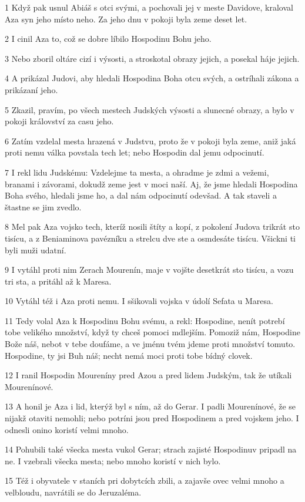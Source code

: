 \par 1 Když pak usnul Abiáš s otci svými, a pochovali jej v meste Davidove, kraloval Aza syn jeho místo neho. Za jeho dnu v pokoji byla zeme deset let.
\par 2 I cinil Aza to, což se dobre líbilo Hospodinu Bohu jeho.
\par 3 Nebo zboril oltáre cizí i výsosti, a stroskotal obrazy jejich, a posekal háje jejich.
\par 4 A prikázal Judovi, aby hledali Hospodina Boha otcu svých, a ostríhali zákona a prikázaní jeho.
\par 5 Zkazil, pravím, po všech mestech Judských výsosti a slunecné obrazy, a bylo v pokoji království za casu jeho.
\par 6 Zatím vzdelal mesta hrazená v Judstvu, proto že v pokoji byla zeme, aniž jaká proti nemu válka povstala tech let; nebo Hospodin dal jemu odpocinutí.
\par 7 I rekl lidu Judskému: Vzdelejme ta mesta, a ohradme je zdmi a vežemi, branami i závorami, dokudž zeme jest v moci naší. Aj, že jsme hledali Hospodina Boha svého, hledali jsme ho, a dal nám odpocinutí odevšad. A tak staveli a štastne se jim zvedlo.
\par 8 Mel pak Aza vojsko tech, kteríž nosili štíty a kopí, z pokolení Judova trikrát sto tisícu, a z Beniaminova pavézníku a strelcu dve ste a osmdesáte tisícu. Všickni ti byli muži udatní.
\par 9 I vytáhl proti nim Zerach Mourenín, maje v vojšte desetkrát sto tisícu, a vozu tri sta, a pritáhl až k Maresa.
\par 10 Vytáhl též i Aza proti nemu. I sšikovali vojska v údolí Sefata u Maresa.
\par 11 Tedy volal Aza k Hospodinu Bohu svému, a rekl: Hospodine, nenít potrebí tobe velikého množství, když ty chceš pomoci mdlejším. Pomoziž nám, Hospodine Bože náš, nebot v tebe doufáme, a ve jménu tvém jdeme proti množství tomuto. Hospodine, ty jsi Buh náš; necht nemá moci proti tobe bídný clovek.
\par 12 I ranil Hospodin Moureníny pred Azou a pred lidem Judským, tak že utíkali Mourenínové.
\par 13 A honil je Aza i lid, kterýž byl s ním, až do Gerar. I padli Mourenínové, že se nijakž otaviti nemohli; nebo potríni jsou pred Hospodinem a pred vojskem jeho. I odnesli onino koristí velmi mnoho.
\par 14 Pohubili také všecka mesta vukol Gerar; strach zajisté Hospodinuv pripadl na ne. I vzebrali všecka mesta; nebo mnoho koristí v nich bylo.
\par 15 Též i obyvatele v staních pri dobytcích zbili, a zajavše ovec velmi mnoho a velbloudu, navrátili se do Jeruzaléma.

